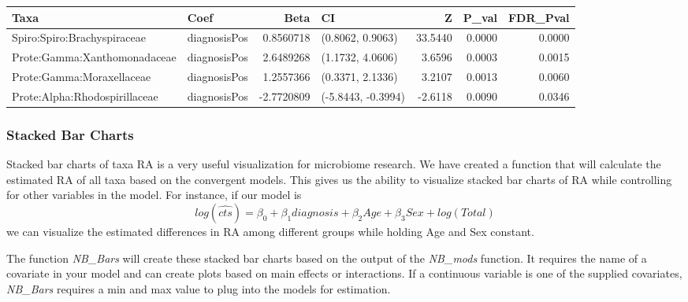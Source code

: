 \documentclass[]{article}
\newenvironment{Shaded}{\begin{snugshade}}{\end{snugshade}}
\newcommand{\KeywordTok}[1]{\textcolor[rgb]{0.13,0.29,0.53}{\textbf{#1}}}
\newcommand{\FloatTok}[1]{\textcolor[rgb]{0.00,0.00,0.81}{#1}}
\newcommand{\StringTok}[1]{\textcolor[rgb]{0.31,0.60,0.02}{#1}}
\newcommand{\CommentTok}[1]{\textcolor[rgb]{0.56,0.35,0.01}{\textit{#1}}}
\newcommand{\OperatorTok}[1]{\textcolor[rgb]{0.81,0.36,0.00}{\textbf{#1}}}
\newcommand{\NormalTok}[1]{#1}
\begin{document}
\begin{Shaded}
\end{Shaded}

\begin{longtable}[]{@{}llrlrrr@{}}
\toprule
Taxa & Coef & Beta & CI & Z & P\_val & FDR\_Pval\tabularnewline
\midrule
\endhead
Spiro:Spiro:Brachyspiraceae & diagnosisPos & 0.8560718 & (0.8062,
0.9063) & 33.5440 & 0.0000 & 0.0000\tabularnewline
Prote:Gamma:Xanthomonadaceae & diagnosisPos & 2.6489268 & (1.1732,
4.0606) & 3.6596 & 0.0003 & 0.0015\tabularnewline
Prote:Gamma:Moraxellaceae & diagnosisPos & 1.2557366 & (0.3371, 2.1336)
& 3.2107 & 0.0013 & 0.0060\tabularnewline
Prote:Alpha:Rhodospirillaceae & diagnosisPos & -2.7720809 & (-5.8443,
-0.3994) & -2.6118 & 0.0090 & 0.0346\tabularnewline
\bottomrule
\end{longtable}

\subsubsection{Stacked Bar Charts}\label{stacked-bar-charts}

Stacked bar charts of taxa RA is a very useful visualization for
microbiome research. We have created a function that will calculate the
estimated RA of all taxa based on the convergent models. This gives us
the ability to visualize stacked bar charts of RA while controlling for
other variables in the model. For instance, if our model is
\[log(\hat{cts}) = \beta_0  + \beta_1 diagnosis + \beta_2 Age + \beta_3 Sex + log(Total)\]
we can visualize the estimated differences in RA among different groups
while holding Age and Sex constant.

The function \emph{NB\_Bars} will create these stacked bar charts based
on the output of the \emph{NB\_mods} function. It requires the name of a
covariate in your model and can create plots based on main effects or
interactions. If a continuous variable is one of the supplied
covariates, \emph{NB\_Bars} requires a min and max value to plug into
the models for estimation.
\end{document}
